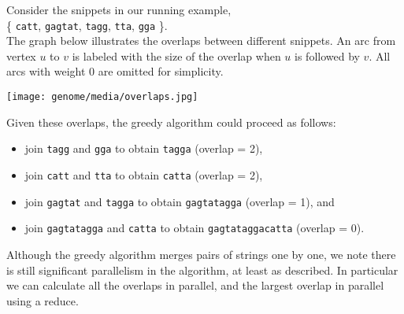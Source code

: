 
\begin{example}
Consider the snippets in our running example, \\
%
\Big\{
%
\texttt{catt}, \texttt{gagtat}, \texttt{tagg}, \texttt{tta},
\texttt{gga}
%
\Big\}.  
%
\\
The graph below illustrates the overlaps between different snippets.
An arc from vertex $u$ to $v$ is labeled with the size of the overlap
when $u$ is followed by $v$.
%
All arcs with weight $0$ are omitted for simplicity.
%
\begin{center}
\texttt{[image: genome/media/overlaps.jpg]}
\end{center}

Given these overlaps, the greedy algorithm could proceed as follows:
\begin{itemize}
\item join \texttt{tagg} and \texttt{gga} to obtain \texttt{tagga}
  (overlap = 2),
\item join \texttt{catt} and \texttt{tta} to obtain \texttt{catta}
  (overlap = 2),
\item join \texttt{gagtat} and \texttt{tagga}  to obtain
  \texttt{gagtatagga} (overlap = 1), and
\item join \texttt{gagtatagga} and \texttt{catta} to obtain
  \texttt{gagtataggacatta} (overlap = 0).
\end{itemize} 

\end{example}

\begin{note}
Although the greedy algorithm merges pairs of strings one by one, we
note there is still significant parallelism in the algorithm, at least
as described.  In particular we can calculate all the overlaps in
parallel, and the largest overlap in parallel using a reduce.
\end{note}

